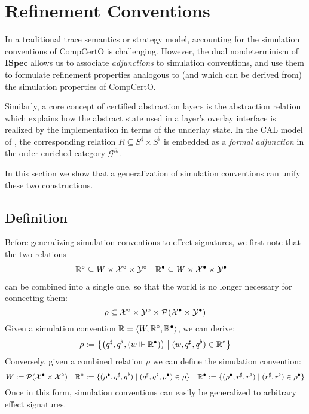\documentclass[acmsmall,review,anonymous]{acmart}\settopmatter{printfolios=true,printccs=false,printacmref=false}
\newcommand{\ISpec}{\mathbf{ISpec}}
\begin{document}
\section{Refinement Conventions} \label{sec:refconv} %

In a traditional trace semantics or strategy model,
accounting for the simulation conventions of CompCertO is challenging.
However,
the dual nondeterminism of $\ISpec$
allows us to associate \emph{adjunctions}
to simulation conventions,
and use them to formulate refinement properties
analogous to (and which can be derived from)
the simulation properties of CompCertO.

Similarly,
a core concept of certified abstraction layers
is the abstraction relation
which explains how the abstract state
used in a layer's overlay interface
is realized by the implementation
in terms of the underlay state.
In the CAL model of \citep{rbgs-cal},
the corresponding relation $R \subseteq S^\sharp \times S^\flat$
is embedded as a \emph{formal adjunction}
in the order-enriched category $\mathcal{G}^{ib}$.

In this section we show that a generalization of
simulation conventions can unify these two constructions.

\subsection{Definition} \label{sec:refconvdef} %

Before generalizing simulation conventions to effect signatures,
we first note that the two relations
\begin{align*}
  \mathbb{R}^\circ &\subseteq W \times \mathcal{X}^\circ \times \mathcal{Y}^\circ &
  \mathbb{R}^\bullet &\subseteq W \times \mathcal{X}^\bullet \times \mathcal{Y}^\bullet
\end{align*}
can be combined into a single one,
so that the world is no longer necessary for connecting them:
\[
  \rho \subseteq \mathcal{X}^\circ \times \mathcal{Y}^\circ \times
    \mathcal{P}(\mathcal{X}^\bullet \times \mathcal{Y}^\bullet)
\]
Given a simulation convention
$\mathbb{R} = \langle W, \mathbb{R}^\circ, \mathbb{R}^\bullet \rangle$,
we can derive:
\[
  \rho := \big\{
    \big(q^\sharp, q^\flat, (w \Vdash \mathbb{R}^\bullet) \big)
    \mathrel{\big|} (w, q^\sharp, q^\flat) \in \mathbb{R}^\circ \big\}
\]
Conversely, given a combined relation $\rho$
we can define the simulation convention:
\[
  W := \mathcal{P}(\mathcal{X}^\bullet \times \mathcal{X}^\circ)
  \quad
  \mathbb{R}^\circ := \{ (\rho^\bullet, q^\sharp, q^\flat)
    \mid (q^\sharp, q^\flat, \rho^\bullet) \in \rho \}
  \quad
  \mathbb{R}^\bullet := \{ (\rho^\bullet, r^\sharp, r^\flat)
    \mid (r^\sharp, r^\flat) \in \rho^\bullet \}
\]
Once in this form,
simulation conventions
can easily be generalized to arbitrary effect signatures.
\end{document}
